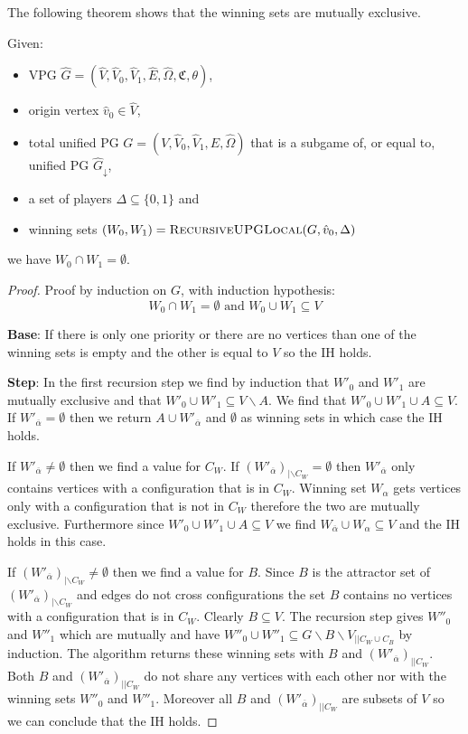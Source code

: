 The following theorem shows that the winning sets are mutually exclusive.
\begin{theorem}Given:
	\begin{itemize}
		\item VPG $\hat{G} = (\hat{V}, \hat{V}_0,\hat{V}_1,\hat{E},\hat{\Omega},\mathfrak{C},\theta)$,
		\item origin vertex $\hat{v}_0 \in \hat{V}$,
		\item total unified PG $G = (V, \hat{V}_0, \hat{V}_1,E,\hat{\Omega})$ that is a subgame of, or equal to, unified PG $\hat{G}_{\downarrow}$,
		\item a set of players $\Delta \subseteq \{0,1\}$ and
		\item winning sets $(W_0,W_1) = \textsc{RecursiveUPGLocal}(G,\hat{v}_0,\Delta)$
	\end{itemize}
	we have $W_0\cap W_1 = \emptyset$.
	\begin{proof}
		Proof by induction on $G$, with induction hypothesis:
		\[ W_0\cap W_1 = \emptyset\text{ and }W_0 \cup W_1 \subseteq V \]
		
		\textbf{Base}: If there is only one priority or there are no vertices than one of the winning sets is empty and the other is equal to $V$ so the IH holds.
		
		\textbf{Step}: In the first recursion step we find by induction that $W'_0$ and $W'_1$ are mutually exclusive and that $W'_0 \cup W'_1 \subseteq V\backslash A$. We find that $W'_0 \cup W'_1 \cup A \subseteq V$. If $W'_{\overline{\alpha}} = \emptyset$ then we return $A\cup W'_{\overline{\alpha}}$ and $\emptyset$ as winning sets in which case the IH holds.
		
		If $W'_{\overline{\alpha}} \neq \emptyset$ then we find a value for $C_W$. If $(W'_{\overline{\alpha}})_{|\backslash C_W} = \emptyset$ then $W'_{\overline{\alpha}}$ only contains vertices with a configuration that is in $C_W$. Winning set $W_\alpha$ gets vertices only with a configuration that is not in $C_W$ therefore the two are mutually exclusive. Furthermore since $W'_0 \cup W'_1 \cup A \subseteq V$ we find $W_{\overline{\alpha}} \cup W_\alpha \subseteq V$ and the IH holds in this case.
		
		If $(W'_{\overline{\alpha}})_{|\backslash C_W} \neq \emptyset$ then we find a value for $B$. Since $B$ is the attractor set of $(W'_{\overline{\alpha}})_{|\backslash C_W}$ and edges do not cross configurations the set $B$ contains no vertices with a configuration that is in $C_W$. Clearly $B \subseteq V$. The recursion step gives $W''_0$ and $W''_1$ which are mutually and have $W''_0 \cup W''_1 \subseteq G\backslash B \backslash V_{||C_W\cup C_B}$ by induction. The algorithm returns these winning sets with $B$ and $(W'_{\overline{\alpha}})_{||C_W}$. Both $B$ and $(W'_{\overline{\alpha}})_{||C_W}$ do not share any vertices with each other nor with the winning sets $W''_0$ and $W''_1$. Moreover all $B$ and $(W'_{\overline{\alpha}})_{||C_W}$ are subsets of $V$ so we can conclude that the IH holds.
	\end{proof}
\end{theorem}

